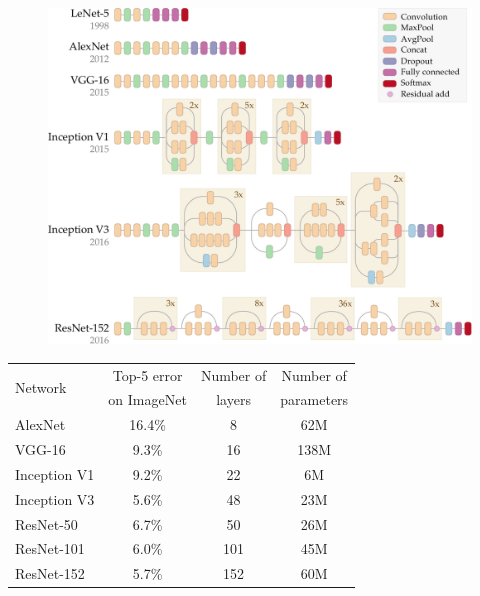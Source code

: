 \begin{figure}[p]
	\centering
	\includegraphics[width=\linewidth]{images/intro_archis}
	\label{shade:fig:archis}
\end{figure}

\begin{table}[p]
	\centering
	\begin{tabular}{lccc}
		\toprule
		\multirow{2}{*}{Network} & Top-5 error & Number of & Number of \\
		                         & on ImageNet & layers & parameters \\
		\midrule
		AlexNet \citep{krizhevsky2012imagenet} & 16.4\% & 8 & 62M\\
		VGG-16 \citep{simonyan2015very} & 9.3\% & 16 & 138M\\
		Inception V1 \citep{szegedy2015going} & 9.2\% & 22 & 6M\\
		Inception V3 \citep{szegedy2016rethinking} & 5.6\% & 48 & 23M\\
		ResNet-50 \citep{he2016deep} & 6.7\% & 50 & 26M\\
		ResNet-101 \citep{he2016deep} & 6.0\% & 101 & 45M\\
		ResNet-152 \citep{he2016deep} & 5.7\% & 152 & 60M\\
		\bottomrule
	\end{tabular}
	\label{shade:fig:ILSVRC}
\end{table}


